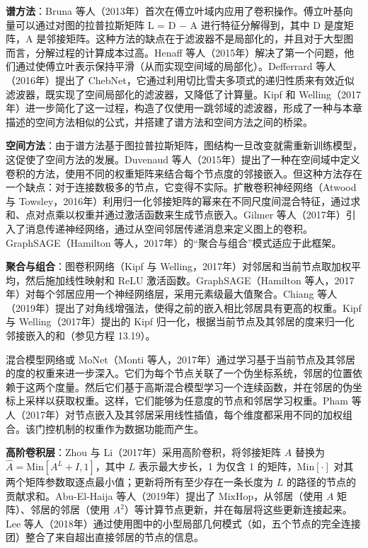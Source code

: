 \documentclass[lang=cn,newtx,10pt,scheme=chinese]{elegantbook}
\begin{document}
\textbf{谱方法}：Bruna 等人（2013年）首次在傅立叶域内应用了卷积操作。傅立叶基向量可以通过对图的拉普拉斯矩阵 L = D − A 进行特征分解得到，其中 D 是度矩阵，A 是邻接矩阵。这种方法的缺点在于滤波器不是局部化的，并且对于大型图而言，分解过程的计算成本过高。Henaff 等人（2015年）解决了第一个问题，他们通过使傅立叶表示保持平滑（从而实现空间域的局部化）。Defferrard 等人（2016年）提出了 ChebNet，它通过利用切比雪夫多项式的递归性质来有效近似滤波器，既实现了空间局部化的滤波器，又降低了计算量。Kipf 和 Welling（2017年）进一步简化了这一过程，构造了仅使用一跳邻域的滤波器，形成了一种与本章描述的空间方法相似的公式，并搭建了谱方法和空间方法之间的桥梁。

\textbf{空间方法}：由于谱方法基于图拉普拉斯矩阵，图结构一旦改变就需重新训练模型，这促使了空间方法的发展。Duvenaud 等人（2015年）提出了一种在空间域中定义卷积的方法，使用不同的权重矩阵来结合每个节点度的邻接嵌入。但这种方法存在一个缺点：对于连接数极多的节点，它变得不实际。扩散卷积神经网络（Atwood 与 Towsley，2016年）利用归一化邻接矩阵的幂来在不同尺度间混合特征，通过求和、点对点乘以权重并通过激活函数来生成节点嵌入。Gilmer 等人（2017年）引入了消息传递神经网络，通过从空间邻居传递消息来定义图上的卷积。GraphSAGE（Hamilton 等人，2017年）的“聚合与组合”模式适应于此框架。

\textbf{聚合与组合}：图卷积网络（Kipf 与 Welling，2017年）对邻居和当前节点取加权平均，然后施加线性映射和 ReLU 激活函数。GraphSAGE（Hamilton 等人，2017年）对每个邻居应用一个神经网络层，采用元素级最大值聚合。Chiang 等人（2019年）提出了对角线增强法，使得之前的嵌入相比邻居具有更高的权重。Kipf 与 Welling（2017年）提出的 Kipf 归一化，根据当前节点及其邻居的度来归一化邻接嵌入的和（参见方程 13.19）。

混合模型网络或 MoNet（Monti 等人，2017年）通过学习基于当前节点及其邻居的度的权重来进一步深入。它们为每个节点关联了一个伪坐标系统，邻居的位置依赖于这两个度量。然后它们基于高斯混合模型学习一个连续函数，并在邻居的伪坐标上采样以获取权重。这样，它们能够为任意度的节点和邻居学习权重。Pham 等人（2017年）对节点嵌入及其邻居采用线性插值，每个维度都采用不同的加权组合。该门控机制的权重作为数据功能而产生。

\textbf{高阶卷积层}：Zhou 与 Li（2017年）采用高阶卷积，将邻接矩阵 \(A\) 替换为 \(\hat{A} = \text{Min}[A^L + I, 1]\)，其中 \(L\) 表示最大步长，1 为仅含 1 的矩阵，\(\text{Min}[\cdot]\) 对其两个矩阵参数取逐点最小值；更新将所有至少存在一条长度为 \(L\) 的路径的节点的贡献求和。Abu-El-Haija 等人（2019年）提出了 \(\text{MixHop}\)，从邻居（使用 \(A\) 矩阵）、邻居的邻居（使用 \(A^2\)）等计算节点更新，并在每层将这些更新连接起来。Lee 等人（2018年）通过使用图中的小型局部几何模式（如，五个节点的完全连接团）整合了来自超出直接邻居的节点的信息。
\end{document}
